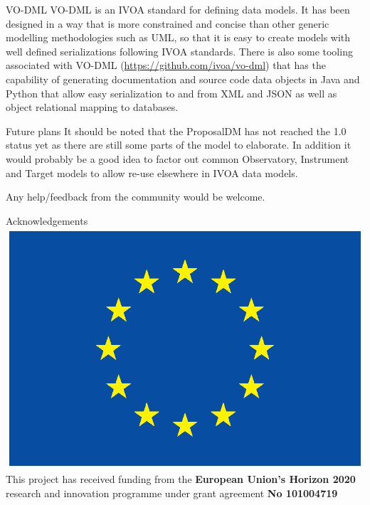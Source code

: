 \documentclass[final]{beamer}
\newlength{\colwidth}
\begin{document}
\begin{frame}[t]
\begin{columns}[t]
\begin{column}{\colwidth}
                \begin{exampleblock}{VO-DML}
                  VO-DML\cite{2018ivoa.spec.0910L} is an IVOA standard for defining data models.
                  It has been designed in a way that is more constrained and concise than other generic modelling methodologies such
                    as UML, so that it is easy to create models with well defined serializations following IVOA standards.
                    There is also some tooling associated with VO-DML (\href{https://github.com/ivoa/vo-dml}{https://github.com/ivoa/vo-dml}) that
                    has the capability of generating documentation and source code data objects in Java and Python that allow
                    easy serialization to and from XML and JSON as well as object relational mapping to databases.
                \end{exampleblock}

                \begin{block}{Future plans}
                   It should be noted that the ProposalDM has not reached the 1.0 status yet as there are still some parts of the model to elaborate.
                   In addition it would probably be a good idea to factor out common Observatory, Instrument and Target models to allow re-use elsewhere in IVOA data models.

                   Any help/feedback from the community would be welcome.

                \end{block}

                \begin{block}{Acknowledgements}
                    \includegraphics[height=\baselineskip]{logos/EU_flag_yellow_eps}
                    This project has received funding from the \textbf{European Union’s Horizon 2020} research and
                    innovation programme under grant agreement \textbf{No 101004719}


\end{block}
\end{column}
\end{columns}
\end{frame}
\end{document}

